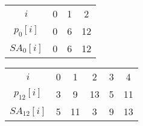 \begin{table}[H]
	\footnotesize
	\centering
	\begin{tabular}{c| c c c }
		$i$ & 0 & 1 & 2 \\
		$p_0[i]$ & 0 & 6 & 12 \\
		$SA_0[i]$ & 0 & 6 & 12 
	\end{tabular}
\end{table}
\begin{table}[H]
	\footnotesize
	\centering
	\begin{tabular}{c| c c c c c }
		$i$ & 0 & 1 & 2 & 3 & 4 \\
		$p_{12}[i]$ & 3 & 9 & 13 & 5 & 11 \\
		$SA_{12}[i]$ & 5 & 11 & 3 & 9 & 13 
	\end{tabular}
\end{table}

